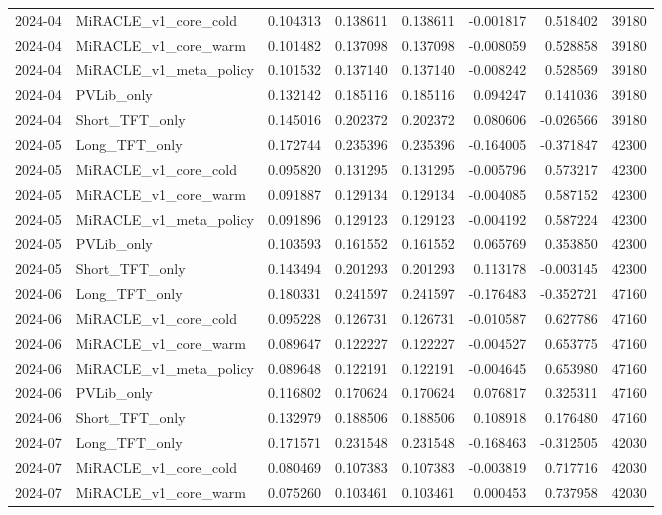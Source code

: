 \begin{tabular}{llrrrrrr}
2024-04 & MiRACLE_v1_core_cold & 0.104313 & 0.138611 & 0.138611 & -0.001817 & 0.518402 & 39180 \\
2024-04 & MiRACLE_v1_core_warm & 0.101482 & 0.137098 & 0.137098 & -0.008059 & 0.528858 & 39180 \\
2024-04 & MiRACLE_v1_meta_policy & 0.101532 & 0.137140 & 0.137140 & -0.008242 & 0.528569 & 39180 \\
2024-04 & PVLib_only & 0.132142 & 0.185116 & 0.185116 & 0.094247 & 0.141036 & 39180 \\
2024-04 & Short_TFT_only & 0.145016 & 0.202372 & 0.202372 & 0.080606 & -0.026566 & 39180 \\
2024-05 & Long_TFT_only & 0.172744 & 0.235396 & 0.235396 & -0.164005 & -0.371847 & 42300 \\
2024-05 & MiRACLE_v1_core_cold & 0.095820 & 0.131295 & 0.131295 & -0.005796 & 0.573217 & 42300 \\
2024-05 & MiRACLE_v1_core_warm & 0.091887 & 0.129134 & 0.129134 & -0.004085 & 0.587152 & 42300 \\
2024-05 & MiRACLE_v1_meta_policy & 0.091896 & 0.129123 & 0.129123 & -0.004192 & 0.587224 & 42300 \\
2024-05 & PVLib_only & 0.103593 & 0.161552 & 0.161552 & 0.065769 & 0.353850 & 42300 \\
2024-05 & Short_TFT_only & 0.143494 & 0.201293 & 0.201293 & 0.113178 & -0.003145 & 42300 \\
2024-06 & Long_TFT_only & 0.180331 & 0.241597 & 0.241597 & -0.176483 & -0.352721 & 47160 \\
2024-06 & MiRACLE_v1_core_cold & 0.095228 & 0.126731 & 0.126731 & -0.010587 & 0.627786 & 47160 \\
2024-06 & MiRACLE_v1_core_warm & 0.089647 & 0.122227 & 0.122227 & -0.004527 & 0.653775 & 47160 \\
2024-06 & MiRACLE_v1_meta_policy & 0.089648 & 0.122191 & 0.122191 & -0.004645 & 0.653980 & 47160 \\
2024-06 & PVLib_only & 0.116802 & 0.170624 & 0.170624 & 0.076817 & 0.325311 & 47160 \\
2024-06 & Short_TFT_only & 0.132979 & 0.188506 & 0.188506 & 0.108918 & 0.176480 & 47160 \\
2024-07 & Long_TFT_only & 0.171571 & 0.231548 & 0.231548 & -0.168463 & -0.312505 & 42030 \\
2024-07 & MiRACLE_v1_core_cold & 0.080469 & 0.107383 & 0.107383 & -0.003819 & 0.717716 & 42030 \\
2024-07 & MiRACLE_v1_core_warm & 0.075260 & 0.103461 & 0.103461 & 0.000453 & 0.737958 & 42030 \\

\end{tabular}
